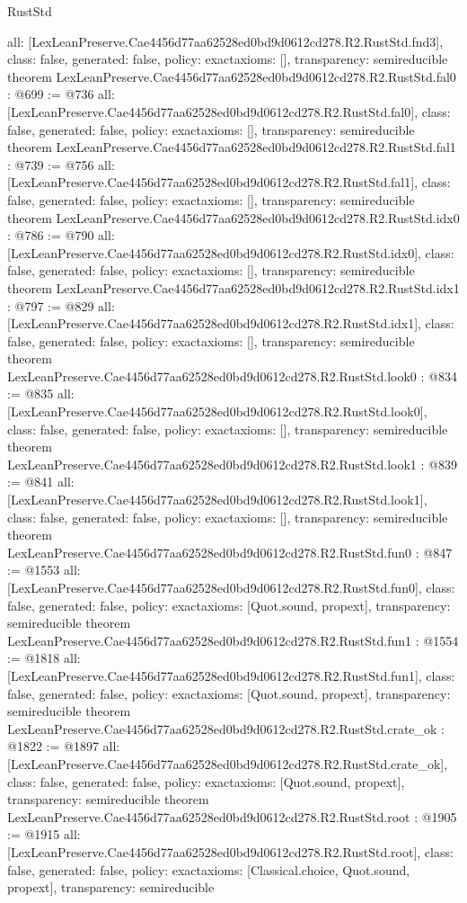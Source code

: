 \begin{lexlean}{RustStd}
\begin{coremodule}
{  all: [LexLeanPreserve.Cae4456d77aa62528ed0bd9d0612cd278.R2.RustStd.fnd3],
  class: false,
  generated: false,
  policy: exact{axioms: []},
  transparency: semireducible
}
theorem LexLeanPreserve.Cae4456d77aa62528ed0bd9d0612cd278.R2.RustStd.fal0 : @699 := @736 {
  all: [LexLeanPreserve.Cae4456d77aa62528ed0bd9d0612cd278.R2.RustStd.fal0],
  class: false,
  generated: false,
  policy: exact{axioms: []},
  transparency: semireducible
}
theorem LexLeanPreserve.Cae4456d77aa62528ed0bd9d0612cd278.R2.RustStd.fal1 : @739 := @756 {
  all: [LexLeanPreserve.Cae4456d77aa62528ed0bd9d0612cd278.R2.RustStd.fal1],
  class: false,
  generated: false,
  policy: exact{axioms: []},
  transparency: semireducible
}
theorem LexLeanPreserve.Cae4456d77aa62528ed0bd9d0612cd278.R2.RustStd.idx0 : @786 := @790 {
  all: [LexLeanPreserve.Cae4456d77aa62528ed0bd9d0612cd278.R2.RustStd.idx0],
  class: false,
  generated: false,
  policy: exact{axioms: []},
  transparency: semireducible
}
theorem LexLeanPreserve.Cae4456d77aa62528ed0bd9d0612cd278.R2.RustStd.idx1 : @797 := @829 {
  all: [LexLeanPreserve.Cae4456d77aa62528ed0bd9d0612cd278.R2.RustStd.idx1],
  class: false,
  generated: false,
  policy: exact{axioms: []},
  transparency: semireducible
}
theorem LexLeanPreserve.Cae4456d77aa62528ed0bd9d0612cd278.R2.RustStd.look0 : @834 := @835 {
  all: [LexLeanPreserve.Cae4456d77aa62528ed0bd9d0612cd278.R2.RustStd.look0],
  class: false,
  generated: false,
  policy: exact{axioms: []},
  transparency: semireducible
}
theorem LexLeanPreserve.Cae4456d77aa62528ed0bd9d0612cd278.R2.RustStd.look1 : @839 := @841 {
  all: [LexLeanPreserve.Cae4456d77aa62528ed0bd9d0612cd278.R2.RustStd.look1],
  class: false,
  generated: false,
  policy: exact{axioms: []},
  transparency: semireducible
}
theorem LexLeanPreserve.Cae4456d77aa62528ed0bd9d0612cd278.R2.RustStd.fun0 : @847 := @1553 {
  all: [LexLeanPreserve.Cae4456d77aa62528ed0bd9d0612cd278.R2.RustStd.fun0],
  class: false,
  generated: false,
  policy: exact{axioms: [Quot.sound, propext]},
  transparency: semireducible
}
theorem LexLeanPreserve.Cae4456d77aa62528ed0bd9d0612cd278.R2.RustStd.fun1 : @1554 := @1818 {
  all: [LexLeanPreserve.Cae4456d77aa62528ed0bd9d0612cd278.R2.RustStd.fun1],
  class: false,
  generated: false,
  policy: exact{axioms: [Quot.sound, propext]},
  transparency: semireducible
}
theorem LexLeanPreserve.Cae4456d77aa62528ed0bd9d0612cd278.R2.RustStd.crate_ok : @1822 := @1897 {
  all: [LexLeanPreserve.Cae4456d77aa62528ed0bd9d0612cd278.R2.RustStd.crate_ok],
  class: false,
  generated: false,
  policy: exact{axioms: [Quot.sound, propext]},
  transparency: semireducible
}
theorem LexLeanPreserve.Cae4456d77aa62528ed0bd9d0612cd278.R2.RustStd.root : @1905 := @1915 {
  all: [LexLeanPreserve.Cae4456d77aa62528ed0bd9d0612cd278.R2.RustStd.root],
  class: false,
  generated: false,
  policy: exact{axioms: [Classical.choice, Quot.sound, propext]},
  transparency: semireducible
}


\end{coremodule}
\end{lexlean}
